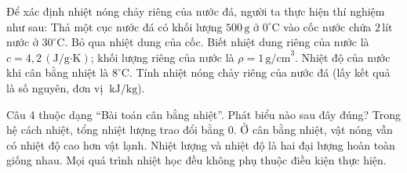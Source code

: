 \begin{ex}
Để xác định nhiệt nóng chảy riêng của nước đá, người ta thực hiện thí nghiệm như sau: 
	Thả một cục nước đá có khối lượng $500\,\mathrm{g}$ ở $0^\circ\mathrm{C}$ vào cốc nước chứa $2\,\text{lít}$ nước ở $30^\circ\mathrm{C}$. 
	Bỏ qua nhiệt dung của cốc. Biết nhiệt dung riêng của nước là $c = 4,2\,(\text{J/g·K})$; khối lượng riêng của nước là $\rho = 1\,\mathrm{g/cm}^3$. 
	Nhiệt độ của nước khi cân bằng nhiệt là $8^\circ\mathrm{C}$. 
	Tính nhiệt nóng chảy riêng của nước đá (lấy kết quả là số nguyên, đơn vị $\ \mathrm{kJ/kg}$).
\end{ex}

\begin{ex}
Câu 4 thuộc dạng “Bài toán cân bằng nhiệt”. Phát biểu nào sau đây đúng?
\choice
{\True Trong hệ cách nhiệt, tổng nhiệt lượng trao đổi bằng 0.}
{Ở cân bằng nhiệt, vật nóng vẫn có nhiệt độ cao hơn vật lạnh.}
{Nhiệt lượng và nhiệt độ là hai đại lượng hoàn toàn giống nhau.}
{Mọi quá trình nhiệt học đều không phụ thuộc điều kiện thực hiện.}
\end{ex}

